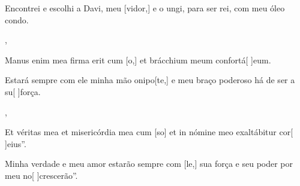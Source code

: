 {        {\item {}Encontrei e escolhi a Davi, meu [vidor,] e o ungi, para ser rei, com meu óleo condo.},
    {\item {}Manus enim mea firma erit cum [o,] et brácchium meum confortá[ ]{e}um.}%
        {\item {}Estará sempre com ele minha mão onipo[te,] e meu braço poderoso há de ser a su[ ]{for}ça.},
    {\item {}Et véritas mea et misericórdia mea cum [so] et in nómine meo exaltábitur cor[ ]{e}ius''.}%
        {\item {}Minha verdade e meu amor estarão sempre com [le,] sua força e seu poder por meu no[ ]{cres}cerão''.}
}